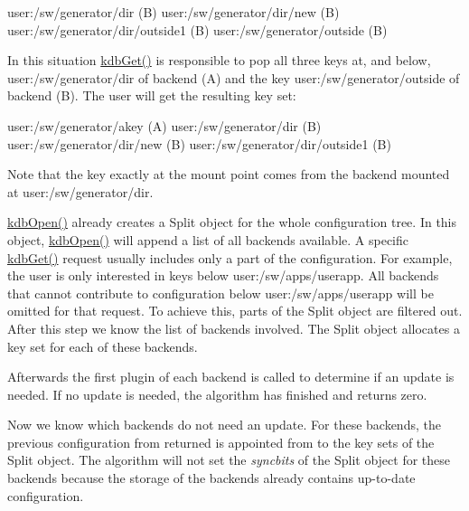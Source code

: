 \begin{DoxyCode}
user:/sw/generator/dir (B)
user:/sw/generator/dir/new (B)
user:/sw/generator/dir/outside1 (B)
user:/sw/generator/outside (B)
\end{DoxyCode}


In this situation {\ttfamily \hyperlink{group__kdb_ga28e385fd9cb7ccfe0b2f1ed2f62453a1}{kdb\+Get()}} is responsible to pop all three keys at, and below, {\ttfamily user\+:/sw/generator/dir} of backend (A) and the key {\ttfamily user\+:/sw/generator/outside} of backend (B). The user will get the resulting key set\+:


\begin{DoxyCode}
user:/sw/generator/akey (A)
user:/sw/generator/dir (B)
user:/sw/generator/dir/new (B)
user:/sw/generator/dir/outside1 (B)
\end{DoxyCode}


Note that the key exactly at the mount point comes from the backend mounted at {\ttfamily user\+:/sw/generator/dir}.

{\ttfamily \hyperlink{group__kdb_ga6808defe5870f328dd17910aacbdc6ca}{kdb\+Open()}} already creates a {\ttfamily Split} object for the whole configuration tree. In this object, {\ttfamily \hyperlink{group__kdb_ga6808defe5870f328dd17910aacbdc6ca}{kdb\+Open()}} will append a list of all backends available. A specific {\ttfamily \hyperlink{group__kdb_ga28e385fd9cb7ccfe0b2f1ed2f62453a1}{kdb\+Get()}} request usually includes only a part of the configuration. For example, the user is only interested in keys below {\ttfamily user\+:/sw/apps/userapp}. All backends that cannot contribute to configuration below {\ttfamily user\+:/sw/apps/userapp} will be omitted for that request. To achieve this, parts of the {\ttfamily Split} object are filtered out. After this step we know the list of backends involved. The {\ttfamily Split} object allocates a key set for each of these backends.

Afterwards the first plugin of each backend is called to determine if an update is needed. If no update is needed, the algorithm has finished and returns zero.

Now we know which backends do not need an update. For these backends, the previous configuration from {\ttfamily returned} is appointed from to the key sets of the {\ttfamily Split} object. The algorithm will not set the {\itshape syncbits} of the {\ttfamily Split} object for these backends because the storage of the backends already contains up-\/to-\/date configuration.


